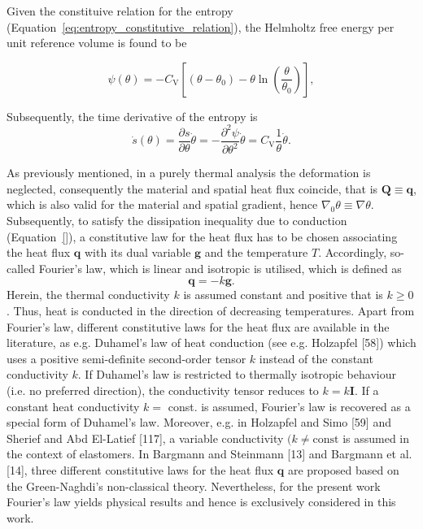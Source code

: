 Given the constituive relation for the entropy (Equation~\eqref{eq:entropy_constitutive_relation}), the Helmholtz free energy per unit reference volume is found to be
\begin{highlight}
\begin{equation}
\psi(\theta)=- C_{\mathrm{V}}\left[\left(\theta-\theta_{0}\right)-\theta \ln \left(\frac{\theta}{\theta_{0}}\right)\right],
\end{equation}
\end{highlight}
Subsequently, the time derivative of the entropy is
\begin{equation}
\dot{s}(\theta)=\frac{\partial s}{\partial \theta} \dot{\theta}=-\frac{\partial^{2} \psi}{\partial \theta^{2}} \dot{\theta}=C_{\mathrm{V}} \frac{1}{\theta} \dot{\theta}.
\end{equation}

As previously mentioned, in a purely thermal analysis the deformation is neglected, consequently the material and spatial heat flux coincide, that is \(\bm Q \equiv \bm q\), which is also valid for the material and spatial gradient, hence \(\nabla_0 \theta \equiv \nabla \theta\).
Subsequently, to satisfy the dissipation inequality due to conduction (Equation~\eqref{}), a constitutive law for the heat flux has to be chosen associating the heat flux \(\bm q\) with its dual variable \(\bm g\) and the temperature \(T\).
Accordingly, so-called Fourier's law, which is linear and isotropic is utilised, which is defined as
\[
\bm q=-k \bm g.
\]
Herein, the thermal conductivity \(k\) is assumed constant and positive that is \(k \geq 0\).
Thus, heat is conducted in the direction of decreasing temperatures.
Apart from Fourier's law, different constitutive laws for the heat flux are available in the literature, as e.g. Duhamel's law of heat conduction (see e.g. Holzapfel [58]) which uses a positive semi-definite second-order tensor \(k\) instead of the constant conductivity \(k\).
If Duhamel's law is restricted to thermally isotropic behaviour (i.e. no preferred direction), the conductivity tensor reduces to \(k=k \boldsymbol{I}\).
If a constant heat conductivity \(k=\) const. is assumed, Fourier's law is recovered as a special form of Duhamel's law. Moreover, e.g. in Holzapfel and Simo [59] and Sherief and Abd El-Latief [117], a variable conductivity \((k \neq \mathrm{const}\) is assumed in the context of elastomers.
In Bargmann and Steinmann [13] and Bargmann et al. [14], three different constitutive laws for the heat flux \(\bm q\) are proposed based on the Green-Naghdi's non-classical theory.
Nevertheless, for the present work Fourier's law yields physical results and hence is exclusively considered in this work.

